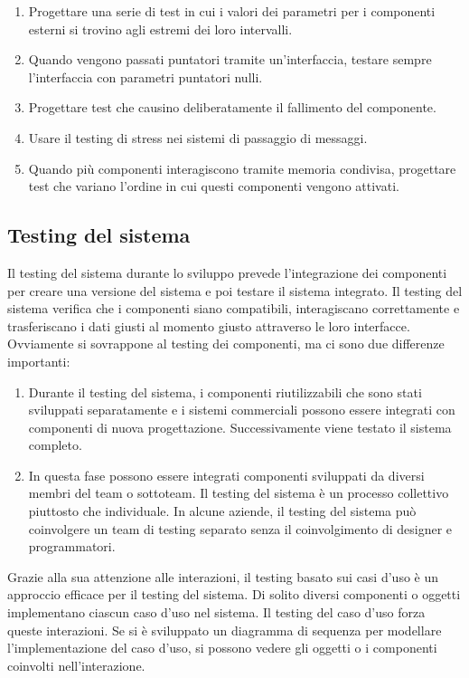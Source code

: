 \begin{enumerate}
    \item Progettare una serie di test in cui i valori dei parametri per i componenti esterni si trovino agli estremi dei loro intervalli.
    \item Quando vengono passati puntatori tramite un’interfaccia, testare sempre l’interfaccia con parametri puntatori nulli.
    \item Progettare test che causino deliberatamente il fallimento del componente.
    \item Usare il testing di stress nei sistemi di passaggio di messaggi.
    \item Quando più componenti interagiscono tramite memoria condivisa, progettare test che variano l'ordine in cui questi componenti vengono attivati.
\end{enumerate}

\subsection{Testing del sistema}
Il testing del sistema durante lo sviluppo prevede l'integrazione dei componenti per creare una versione del sistema e poi testare il sistema integrato. Il testing del sistema verifica che i componenti siano compatibili, interagiscano correttamente e trasferiscano i dati giusti al momento giusto attraverso le loro interfacce. Ovviamente si sovrappone al testing dei componenti, ma ci sono due differenze importanti:
\begin{enumerate}
    \item Durante il testing del sistema, i componenti riutilizzabili che sono stati sviluppati separatamente e i sistemi commerciali possono essere integrati con componenti di nuova progettazione. Successivamente viene testato il sistema completo.
    \item In questa fase possono essere integrati componenti sviluppati da diversi membri del team o sottoteam. Il testing del sistema è un processo collettivo piuttosto che individuale. In alcune aziende, il testing del sistema può coinvolgere un team di testing separato senza il coinvolgimento di designer e programmatori.
\end{enumerate}
Grazie alla sua attenzione alle interazioni, il testing basato sui casi d'uso è un approccio efficace per il testing del sistema. Di solito diversi componenti o oggetti implementano ciascun caso d'uso nel sistema. Il testing del caso d'uso forza queste interazioni. Se si è sviluppato un diagramma di sequenza per modellare l’implementazione del caso d'uso, si possono vedere gli oggetti o i componenti coinvolti nell'interazione.

